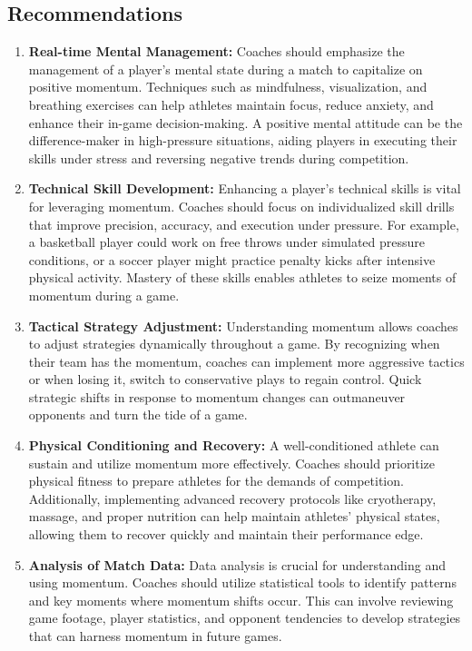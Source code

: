 \documentclass{article}
\begin{document}
\subsection{Recommendations}
\begin{enumerate}
      \item \textbf{Real-time Mental Management:} Coaches should emphasize the management of a player's mental state during a match to capitalize on positive momentum. Techniques such as mindfulness, visualization, and breathing exercises can help athletes maintain focus, reduce anxiety, and enhance their in-game decision-making. A positive mental attitude can be the difference-maker in high-pressure situations, aiding players in executing their skills under stress and reversing negative trends during competition.
      \item \textbf{Technical Skill Development:} Enhancing a player's technical skills is vital for leveraging momentum. Coaches should focus on individualized skill drills that improve precision, accuracy, and execution under pressure. For example, a basketball player could work on free throws under simulated pressure conditions, or a soccer player might practice penalty kicks after intensive physical activity. Mastery of these skills enables athletes to seize moments of momentum during a game.
      \item \textbf{Tactical Strategy Adjustment:} Understanding momentum allows coaches to adjust strategies dynamically throughout a game. By recognizing when their team has the momentum, coaches can implement more aggressive tactics or when losing it, switch to conservative plays to regain control. Quick strategic shifts in response to momentum changes can outmaneuver opponents and turn the tide of a game.
      \item \textbf{Physical Conditioning and Recovery:} A well-conditioned athlete can sustain and utilize momentum more effectively. Coaches should prioritize physical fitness to prepare athletes for the demands of competition. Additionally, implementing advanced recovery protocols like cryotherapy, massage, and proper nutrition can help maintain athletes' physical states, allowing them to recover quickly and maintain their performance edge.
      \item \textbf{Analysis of Match Data:} Data analysis is crucial for understanding and using momentum. Coaches should utilize statistical tools to identify patterns and key moments where momentum shifts occur. This can involve reviewing game footage, player statistics, and opponent tendencies to develop strategies that can harness momentum in future games.

\end{enumerate}
\end{document}
